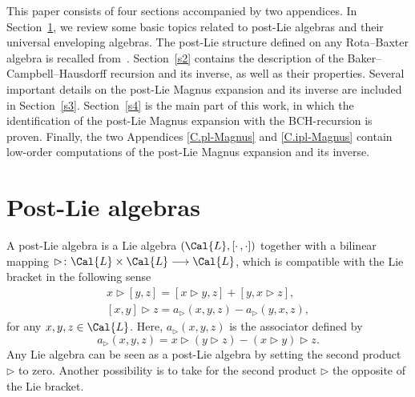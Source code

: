 \documentclass[pdftex]{sigma}
\numberwithin{equation}{section}
\begin{document}
This paper consists of four sections accompanied by two appendices. In Section~\ref{s1}, we review some basic topics related to post-Lie algebras and their universal enveloping algebras. The post-Lie structure defined on any Rota--Baxter algebra is recalled from~\cite{BGN10}. Section~\ref{s2} contains the description of the Baker--Campbell--Hausdorff recursion and its inverse, as well as their properties. Several important details on the post-Lie Magnus expansion and its inverse are included in Section~\ref{s3}. Section~\ref{s4} is the main part of this work, in which the identification of the post-Lie Magnus expansion with the BCH-recursion is proven. Finally, the two Appendices \ref{C.pl-Magnus} and \ref{C.ipl-Magnus} contain low-order computations of the post-Lie Magnus expansion and its inverse.

\section{Post-Lie algebras}\label{s1}

A post-Lie algebra is a Lie algebra $(\Cal{L},[\cdot\,,\cdot])$ together with a bilinear mapping $\rhd\colon \Cal{L} \times \Cal{L} \longrightarrow \Cal{L}$, which is compatible with the Lie bracket in the following sense
\begin{gather}\label{eq1}
x \rhd [y,z] = [x\rhd y,z]+ [y, x \rhd z],
\\
\label{eq2}
[x,y]\rhd z = a_{\rhd}(x,y,z)-a_{\rhd}(y,x,z),
\end{gather}
for any $x, y, z \in \Cal{L}$. Here, $a_{\rhd}(x,y,z)$ is the associator defined by
\begin{displaymath}
a_{\rhd}(x,y,z)=x \rhd (y \rhd z) - (x \rhd y) \rhd z.
\end{displaymath}
Any Lie algebra can be seen as a post-Lie algebra by setting the second product $\rhd$ to zero. Another possibility is to take for the second product $\rhd$ the opposite of the Lie bracket.
\end{document}
